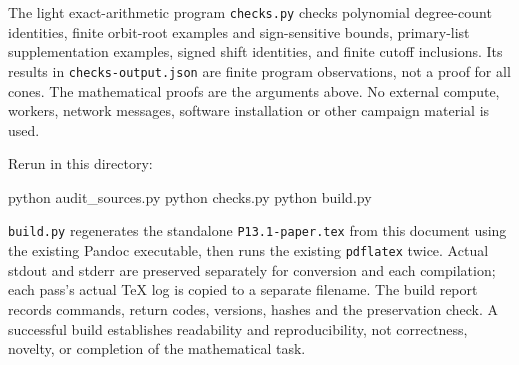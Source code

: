 \documentclass[
  11pt,
]{article}
\newenvironment{Shaded}{}{}
\newcommand{\ExtensionTok}[1]{#1}
\newcommand{\NormalTok}[1]{#1}
\begin{document}
The light exact-arithmetic program \texttt{checks.py} checks polynomial
degree-count identities, finite orbit-root examples and sign-sensitive
bounds, primary-list supplementation examples, signed shift identities,
and finite cutoff inclusions. Its results in \texttt{checks-output.json}
are finite program observations, not a proof for all cones. The
mathematical proofs are the arguments above. No external compute,
workers, network messages, software installation or other campaign
material is used.

Rerun in this directory:

\begin{Shaded}
\begin{Highlighting}[]
\ExtensionTok{python}\NormalTok{ audit\_sources.py}
\ExtensionTok{python}\NormalTok{ checks.py}
\ExtensionTok{python}\NormalTok{ build.py}
\end{Highlighting}
\end{Shaded}

\texttt{build.py} regenerates the standalone \texttt{P13.1-paper.tex}
from this document using the existing Pandoc executable, then runs the
existing \texttt{pdflatex} twice. Actual stdout and stderr are preserved
separately for conversion and each compilation; each pass's actual TeX
log is copied to a separate filename. The build report records commands,
return codes, versions, hashes and the preservation check. A successful
build establishes readability and reproducibility, not correctness,
novelty, or completion of the mathematical task.
\end{document}
